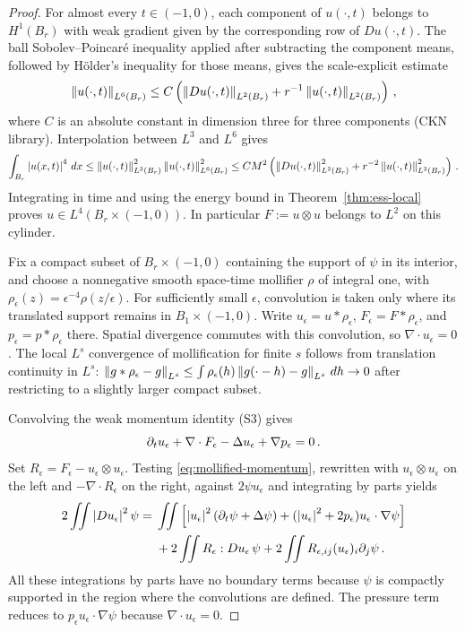 \documentclass[11pt,letterpaper]{article}
\numberwithin{equation}{section}
\theoremstyle{plain}
\theoremstyle{definition}
\theoremstyle{remark}
\begin{document}
\begin{proof}
For almost every $t\in(-1,0)$, each component of $u(\cdot,t)$ belongs to $H^1(B_r)$ with weak gradient given by the corresponding row of $Du(\cdot,t)$. The ball Sobolev--Poincar\'e inequality applied after subtracting the component means, followed by H\"older's inequality for those means, gives the scale-explicit estimate
\begin{equation}\label{eq:local-sobolev-L6}
\left\lVert u(\cdot,t)\right\rVert_{L^6(B_r)}\le C\left(\left\lVert Du(\cdot,t)\right\rVert_{L^2(B_r)}
 +r^{-1}\left\lVert u(\cdot,t)\right\rVert_{L^2(B_r)}\right)\,,
\end{equation}
where $C$ is an absolute constant in dimension three for three components (CKN library). Interpolation between $L^3$ and $L^6$ gives
\begin{equation}\label{eq:local-interpolate-L4}
\int_{B_r}\left\lvert u(x,t)\right\rvert^4\,dx\le\left\lVert u(\cdot,t)\right\rVert_{L^3(B_r)}^2
 \left\lVert u(\cdot,t)\right\rVert_{L^6(B_r)}^2\le CM^2\left(\left\lVert Du(\cdot,t)\right\rVert_{L^2(B_r)}^2
 +r^{-2}\left\lVert u(\cdot,t)\right\rVert_{L^2(B_r)}^2\right)\,.
\end{equation}
Integrating in time and using the energy bound in Theorem~\ref{thm:ess-local} proves $u\in L^4(B_r\times(-1,0))$. In particular $F:=u\otimes u$ belongs to $L^2$ on this cylinder.

Fix a compact subset of $B_r\times(-1,0)$ containing the support of $\psi$ in its interior, and choose a nonnegative smooth space-time mollifier $\rho$ of integral one, with $\rho_\epsilon(z)=\epsilon^{-4}\rho(z/\epsilon)$. For sufficiently small $\epsilon$, convolution is taken only where its translated support remains in $B_1\times(-1,0)$. Write $u_\epsilon=u*\rho_\epsilon$, $F_\epsilon=F*\rho_\epsilon$, and $p_\epsilon=p*\rho_\epsilon$ there. Spatial divergence commutes with this convolution, so $\nabla\cdot u_\epsilon=0$. The local $L^s$ convergence of mollification for finite $s$ follows from translation continuity in $L^s$: $\left\lVert g*\rho_\epsilon-g\right\rVert_{L^s}\le\int\rho_\epsilon(h)\left\lVert g(\cdot-h)-g\right\rVert_{L^s}\,dh\to0$ after restricting to a slightly larger compact subset.

Convolving the weak momentum identity (S3) gives
\begin{equation}\label{eq:mollified-momentum}
\partial_t u_\epsilon+\nabla\cdot F_\epsilon-\Delta u_\epsilon+\nabla p_\epsilon=0\,.
\end{equation}
Set $R_\epsilon=F_\epsilon-u_\epsilon\otimes u_\epsilon$. Testing \eqref{eq:mollified-momentum}, rewritten with $u_\epsilon\otimes u_\epsilon$ on the left and $-\nabla\cdot R_\epsilon$ on the right, against $2\psi u_\epsilon$ and integrating by parts yields
\begin{align}\label{eq:mollified-energy}
2\iint\left\lvert Du_\epsilon\right\rvert^2\psi
={}&\iint\left[\left\lvert u_\epsilon\right\rvert^2(\partial_t\psi+\Delta\psi)
 +(\left\lvert u_\epsilon\right\rvert^2+2p_\epsilon)u_\epsilon\cdot\nabla\psi\right]\notag\\
&+2\iint R_\epsilon:Du_\epsilon\,\psi
 +2\iint R_{\epsilon,ij}(u_\epsilon)_i\partial_j\psi\,.
\end{align}
All these integrations by parts have no boundary terms because $\psi$ is compactly supported in the region where the convolutions are defined. The pressure term reduces to $p_\epsilon u_\epsilon\cdot\nabla\psi$ because $\nabla\cdot u_\epsilon=0$.


\end{proof}
\end{document}
